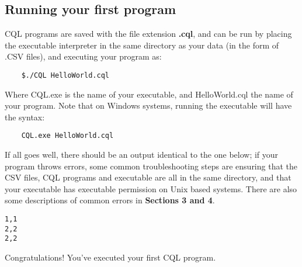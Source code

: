 \subsection{Running your first program}
\begin{normalsize}
CQL programs are saved with the file extension \textbf{.cql}, and can be run by placing the executable interpreter in the same directory as your data (in the form of .CSV files), and executing your program as:
\begin{lstlisting}
	$./CQL HelloWorld.cql
\end{lstlisting}
Where CQL.exe is the name of your executable, and HelloWorld.cql the name of your program. Note that on Windows systems, running the executable will have the syntax:
\begin{lstlisting}
	CQL.exe HelloWorld.cql
\end{lstlisting}
If all goes well, there should be an output identical to the one below; if your program throws errors, some common troubleshooting steps are ensuring that the CSV files, CQL programs and executable are all in the same directory, and that your executable has executable permission on Unix based systems. There are also some descriptions of common errors in \textbf{Sections 3 and 4}.
\end{normalsize}
\begin{lstlisting}[style=framed]
1,1
2,2
2,2
\end{lstlisting}
\begin{normalsize}
Congratulations! You've executed your first CQL program. 
\end{normalsize}